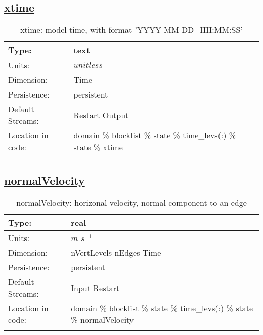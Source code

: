 \subsection[xtime]{\hyperref[sec:var_tab_state]{xtime}}
\label{subsec:var_sec_state_xtime}
\begin{center}
\begin{longtable}{| p{2.0in} | p{4.0in} |}
        \hline 
        Type: & text \\
        \hline 
        Units: & $unitless$ \\
        \hline 
        Dimension: & Time \\
        \hline 
        Persistence: & persistent \\
        \hline 
		 Default Streams: & Restart Output  \\
        \hline 
		 Location in code: & domain \% blocklist \% state \% time\_levs(:) \% state \% xtime \\
		 \hline 
    \caption{xtime: model time, with format 'YYYY-MM-DD\_HH:MM:SS'}
\end{longtable}
\end{center}
\subsection[normalVelocity]{\hyperref[sec:var_tab_state]{normalVelocity}}
\label{subsec:var_sec_state_normalVelocity}
\begin{center}
\begin{longtable}{| p{2.0in} | p{4.0in} |}
        \hline 
        Type: & real \\
        \hline 
        Units: & $m$ $s^{-1}$ \\
        \hline 
        Dimension: & nVertLevels nEdges Time \\
        \hline 
        Persistence: & persistent \\
        \hline 
		 Default Streams: & Input Restart  \\
        \hline 
		 Location in code: & domain \% blocklist \% state \% time\_levs(:) \% state \% normalVelocity \\
		 \hline 
    \caption{normalVelocity: horizonal velocity, normal component to an edge}
\end{longtable}
\end{center}
